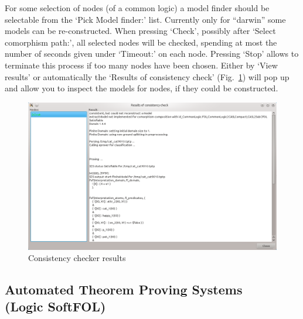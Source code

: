 \documentclass{article}
\begin{document}
For some selection of nodes (of a common logic) a model finder should be
selectable from the `Pick Model finder:' list. Currently only for ``darwin''
some \CASL models can be re-constructed. When pressing `Check', possibly after
`Select comorphism path:', all selected nodes will be checked, spending at
most the number of seconds given under `Timeout:' on each node. Pressing
`Stop' allows to terminate this process if too many nodes have been chosen.
Either by `View results' or automatically the `Results of consistency check'
(Fig.~\ref{fig:cons_res}) will pop up and allow you to inspect the models for
nodes, if they could be constructed.

\begin{figure}[ht]
  \centering
  \includegraphics[width=0.75\linewidth,keepaspectratio=true]{UserGuideCL_Consistency_Result}
  \caption{Consistency checker results\label{fig:cons_res}}
\end{figure}

\subsection[Automated Theorem Proving Systems]
{Automated Theorem Proving Systems\\(Logic SoftFOL)}
\label{sec:ATP}
\end{document}
